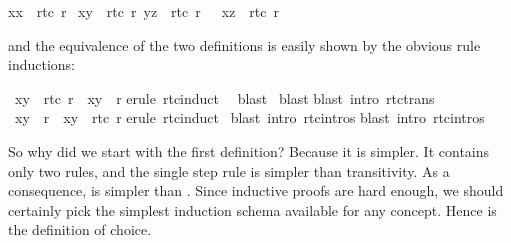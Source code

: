 \begin{isabellebody}
{\isachardoublequote}{\isacharparenleft}x{\isacharcomma}x{\isacharparenright}\ {\isasymin}\ rtc{}\ r{\isachardoublequote}\isanewline
{\isachardoublequote}{\isasymlbrakk}\ {\isacharparenleft}x{\isacharcomma}y{\isacharparenright}\ {\isasymin}\ rtc{}\ r{\isacharsemicolon}\ {\isacharparenleft}y{\isacharcomma}z{\isacharparenright}\ {\isasymin}\ rtc{}\ r\ {\isasymrbrakk}\ {\isasymLongrightarrow}\ {\isacharparenleft}x{\isacharcomma}z{\isacharparenright}\ {\isasymin}\ rtc{}\ r{\isachardoublequote}%
\begin{isamarkuptext}%
\noindent
and the equivalence of the two definitions is easily shown by the obvious rule
inductions:%
\end{isamarkuptext}%
\ {\isachardoublequote}{\isacharparenleft}x{\isacharcomma}y{\isacharparenright}\ {\isasymin}\ rtc{}\ r\ {\isasymLongrightarrow}\ {\isacharparenleft}x{\isacharcomma}y{\isacharparenright}\ {\isasymin}\ r{\isacharasterisk}{\isachardoublequote}\isanewline
{}erule\ rtc{}{\isachardot}induct{\isacharparenright}\isanewline
\ \ blast{\isacharparenright}\isanewline
\ blast{\isacharparenright}\isanewline
{}blast\ intro{\isacharcolon}\ rtc{\isacharunderscore}trans{\isacharparenright}\isanewline
{}\isanewline
\isanewline
{}\ {\isachardoublequote}{\isacharparenleft}x{\isacharcomma}y{\isacharparenright}\ {\isasymin}\ r{\isacharasterisk}\ {\isasymLongrightarrow}\ {\isacharparenleft}x{\isacharcomma}y{\isacharparenright}\ {\isasymin}\ rtc{}\ r{\isachardoublequote}\isanewline
{}erule\ rtc{\isachardot}induct{\isacharparenright}\isanewline
\ blast\ intro{\isacharcolon}\ rtc{}{\isachardot}intros{\isacharparenright}\isanewline
{}blast\ intro{\isacharcolon}\ rtc{}{\isachardot}intros{\isacharparenright}\isanewline
{}%
\begin{isamarkuptext}%
So why did we start with the first definition? Because it is simpler. It
contains only two rules, and the single step rule is simpler than
transitivity.  As a consequence,  is simpler than
. Since inductive proofs are hard enough, we should
certainly pick the simplest induction schema available for any concept.
Hence  is the definition of choice.


\end{isamarkuptext}
\end{isabellebody}
